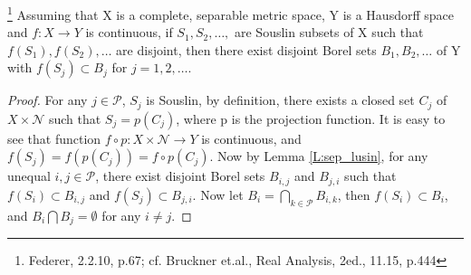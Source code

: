 \begin{corollary} \label{C:sep_souslin}
\footnote{Federer, 2.2.10, p.67; cf. Bruckner et.al., Real Analysis, 2ed., 11.15, p.444}
Assuming that X is a complete, separable metric space, Y is a Hausdorff space
and $f:X\to Y$ is continuous, 
if $S_1,S_2,\dots,$ are Souslin subsets of X such that $f(S_1),f(S_2),\dots$ are
disjoint, then there exist disjoint Borel sets $B_1,B_2,\dots$ of Y with 
$f(S_j)\subset B_j$ for $j=1,2,\dots$.
\end{corollary}
\begin{proof}
For any $j\in\mathcal{P}$, $S_j$ is Souslin, by definition, there exists a
closed set $C_j$ of $X\times\mathcal{N}$ such that $S_j=p(C_j)$, where p is the
projection function. It is easy to see that function 
$f\circ p:X\times \mathcal{N}\to Y$ is continuous, and
$f(S_j)=f(p(C_j))=f\circ p (C_j)$. Now by Lemma \ref{L:sep_lusin}, for any 
unequal $i,j\in\mathcal{P}$, there exist disjoint Borel sets $B_{i,j}$ and
$B_{j,i}$ such that $f(S_i)\subset B_{i,j}$ and $f(S_j)\subset B_{j,i}$.
Now let $B_i=\bigcap_{k\in\mathcal{P}} B_{i,k}$, then $f(S_i)\subset B_i$, and
$B_i\bigcap B_j=\emptyset$ for any $i\neq j$.
\end{proof}


